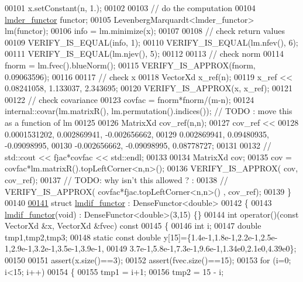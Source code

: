 \begin{DoxyCode}
00101   x.setConstant(n, 1.);
00102 
00103   \textcolor{comment}{// do the computation}
00104   \hyperlink{structlmder__functor}{lmder\_functor} functor;
00105   LevenbergMarquardt<lmder\_functor> lm(functor);
00106   info = lm.minimize(x);
00107 
00108   \textcolor{comment}{// check return values}
00109   VERIFY\_IS\_EQUAL(info, 1);
00110   VERIFY\_IS\_EQUAL(lm.nfev(), 6);
00111   VERIFY\_IS\_EQUAL(lm.njev(), 5);
00112 
00113   \textcolor{comment}{// check norm}
00114   fnorm = lm.fvec().blueNorm();
00115   VERIFY\_IS\_APPROX(fnorm, 0.09063596);
00116 
00117   \textcolor{comment}{// check x}
00118   VectorXd x\_ref(n);
00119   x\_ref << 0.08241058, 1.133037, 2.343695;
00120   VERIFY\_IS\_APPROX(x, x\_ref);
00121 
00122   \textcolor{comment}{// check covariance}
00123   covfac = fnorm*fnorm/(m-n);
00124   internal::covar(lm.matrixR(), lm.permutation().indices()); \textcolor{comment}{// TODO : move this as a function of lm}
00125 
00126   MatrixXd cov\_ref(n,n);
00127   cov\_ref <<
00128       0.0001531202,   0.002869941,  -0.002656662,
00129       0.002869941,    0.09480935,   -0.09098995,
00130       -0.002656662,   -0.09098995,    0.08778727;
00131 
00132 \textcolor{comment}{//  std::cout << fjac*covfac << std::endl;}
00133 
00134   MatrixXd cov;
00135   cov =  covfac*lm.matrixR().topLeftCorner<n,n>();
00136   VERIFY\_IS\_APPROX( cov, cov\_ref);
00137   \textcolor{comment}{// TODO: why isn't this allowed ? :}
00138   \textcolor{comment}{// VERIFY\_IS\_APPROX( covfac*fjac.topLeftCorner<n,n>() , cov\_ref);}
00139 \}
00140 
\hyperlink{structlmdif__functor}{00141} \textcolor{keyword}{struct }\hyperlink{structlmdif__functor}{lmdif\_functor} : DenseFunctor<double>
00142 \{
00143     \hyperlink{structlmdif__functor}{lmdif\_functor}(\textcolor{keywordtype}{void}) : DenseFunctor<double>(3,15) \{\}
00144     \textcolor{keywordtype}{int} operator()(\textcolor{keyword}{const} VectorXd &x, VectorXd &fvec)\textcolor{keyword}{ const}
00145 \textcolor{keyword}{    }\{
00146         \textcolor{keywordtype}{int} i;
00147         \textcolor{keywordtype}{double} tmp1,tmp2,tmp3;
00148         \textcolor{keyword}{static} \textcolor{keyword}{const} \textcolor{keywordtype}{double} y[15]=\{1.4e-1,1.8e-1,2.2e-1,2.5e-1,2.9e-1,3.2e-1,3.5e-1,3.9e-1,
00149             3.7e-1,5.8e-1,7.3e-1,9.6e-1,1.34e0,2.1e0,4.39e0\};
00150 
00151         assert(x.size()==3);
00152         assert(fvec.size()==15);
00153         \textcolor{keywordflow}{for} (i=0; i<15; i++)
00154         \{
00155             tmp1 = i+1;
00156             tmp2 = 15 - i;

\end{DoxyCode}
